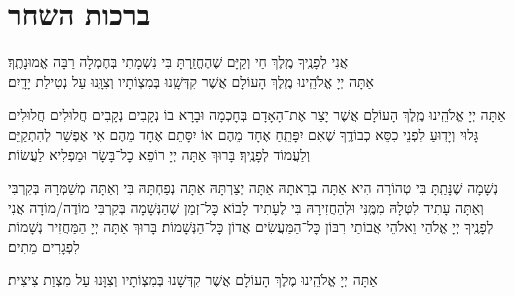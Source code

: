 \chapter[ברכות השחר]{ ברכות השחר }

אֲנִי לְפָנֶֽיךָ מֶֽלֶךְ חַי וְקַיָּם \middot שֶׁהֶחֱזַֽרְתָּ בִּי נִשְׁמָתִי בְּחֶמְלָה \middot רַבָּה אֱמוּנָתֶֽךָ׃\\
אַתָּה יְיָ אֱלֹהֵֽינוּ מֶֽלֶךְ הָעוֹלָם \middot אֲשֶׁר קִדְּשָֽׁנוּ בְּמִצְוֹתָיו וְצִוָּֽנוּ עַל נְטִילַת יָדָֽיִם׃

אַתָּה יְיָ אֱלֹהֵֽינוּ מֶֽלֶךְ הָעוֹלָם אֲשֶׁר יָצַר אֶת־הָאָדָם בְּחׇכְמָה וּבָרָא בוֹ נְקָבִים נְקָבִים חֲלוּלִים חֲלוּלִים \middot גָּלוּי וְיָדֽוּעַ לִפְנֵי כִסֵּא כְבוֹדֶֽךָ שֶׁאִם יִפָּתֵֽחַ אֶחָד מֵהֶם אוֹ יִסָּתֵם אֶחָד מֵהֶם אִי אֶפְשַׁר לְהִתְקַיֵּם וְלַעֲמוֹד לְפָנֶֽיךָ׃ בָּרוּךְ אַתָּה יְיָ רוֹפֵא כׇל־בָּשָׂר וּמַפְלִיא לַעֲשׂוֹת׃


נְשָׁמָה שֶׁנָּתַֽתָּ בִּי טְהוֹרָה הִיא \middot אַתָּה בְרָאתָהּ אַתָּה יְצַרְתָּהּ אַתָּה נְפַחְתָּהּ בִּי וְאַתָּה מְשַׁמְּרָהּ בְּקִרְבִּי וְאַתָּה עָתִיד לִטְּלָהּ מִמֶּֽנִּי וּלְהַחֲזִירָהּ בִּי לֶעָתִיד לָבוֹא \middot כׇּל־זְמַן שֶׁהַנְּשָׁמָה בְּקִרְבִּי מוֹדֶה/מוֹדָה אֲנִי לְפָנֶֽיךָ יְיָ אֱלֹהַי וֵאלֹהֵי אֲבוֹתַי רִבּוֹן כׇּל־הַמַּעֲשִׂים אֲדוֹן כׇּל־הַנְּשָׁמוֹת׃ בָּרוּךְ אַתָּה יְיָ הַמַּחֲזִיר נְשָׁמוֹת לִפְגָרִים מֵתִים׃

אַתָּה יְיָ אֱלֹהֵֽינוּ מֶלֶךְ הָעוֹלָם אֲשֶׁר קִדְּשָׁנוּ בְּמִצְוֹתָיו וְצִוָּנוּ עַל מִצְוַת צִיצִית׃

\newcommand{\birkothatorah}{
	בָּרוּךְ אַתָּה יְיָ אֱלֹהֵֽינוּ מֶֽלֶךְ הָעוֹלָם אֲשֶׁר קִדְּשָֽׁנוּ בְּמִצְוֹתָיו וְצִוָּֽנוּ לַעֲסוֹק בְּדִבְרֵי תוֹרָה׃ וְהַעֲרֶב־נָא יְיָ אֱלֹהֵֽינוּ אֶת־דִּבְרֵי תוֹרָתְךָ בְּפִֽינוּ וּבְפִיפִיּוֹת עַמְּךָ בֵּית יִשְׂרָאֵל \middot וְנִהְיֶה אֲנַֽחְנוּ וְצֶאֱצָאֵֽינוּ וְצֶאֱצָאֵי עַמְּךָ בֵּית יִשְׂרָאֵל כֻּלָּֽנוּ יוֹדְעֵי שְׁמֶֽךָ וְלוֹמְדֵי תוֹרָתֶֽךָ לִשְׁמָהּ׃ בָּרוּךְ אַתָּה יְיָ הַמְלַמֵּד תּוֹרָה לְעַמּוֹ יִשְׂרָאֵל׃
	
	בָּרוּךְ אַתָּה יְיָ אֱלֹהֵֽינוּ מֶֽלֶךְ הָעוֹלָם אֲשֶׁר בָּֽחַר־בָּֽנוּ מִכׇּל־הָעַמִּים וְנָֽתַן־לָֽנוּ אֶת־תּוֹרָתוֹ׃ בָּרוּךְ אַתָּה יְיָ נוֹתֵן הַתּוֹרָה׃\\}

